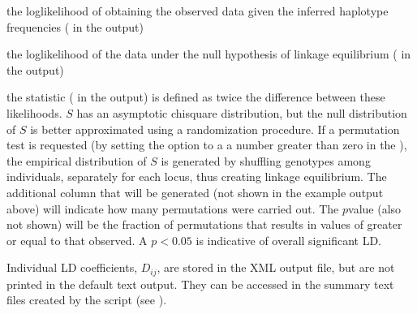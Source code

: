 \documentclass[letterpaper,10pt,english,openany,oneside]{sphinxmanual}
\begin{document}
\begin{description}
\sphinxAtStartPar
the log\sphinxhyphen{}likelihood of obtaining the observed data given the inferred
haplotype frequencies ( in the output)

\sphinxAtStartPar
the log\sphinxhyphen{}likelihood of the data under the null hypothesis of linkage
equilibrium ( in the output)

\sphinxAtStartPar
the statistic ( in the output) is defined as twice the
difference between these likelihoods. \(S\) has an asymptotic
chi\sphinxhyphen{}square distribution, but the null distribution of \(S\) is
better approximated using a randomization procedure. If a
permutation test is requested (by setting the option
 to a a number greater than zero in the
{\hyperref[\detokenize{docs/guide-chapter-usage:config-allpairwiseldwithpermu}]{}}), the empirical
distribution of \(S\) is generated by shuffling genotypes among
individuals, separately for each locus, thus creating linkage
equilibrium. The additional column  that will be
generated (not shown in the example output above) will indicate how
many permutations were carried out. The \(p\)\sphinxhyphen{}value (also not
shown) will be the fraction of permutations that results in values of
 greater or equal to that observed. A \(p < 0.05\) is
indicative of overall significant LD.

\end{description}

\sphinxAtStartPar
Individual LD coefficients, \(D_{ij}\), are stored in the XML
output file, but are not printed in the default text output. They can
be accessed in the summary text files created by the 
script (see {\hyperref[\detokenize{docs/guide-chapter-usage:guide-usage-intro-run-details}]{}}).
\end{document}
